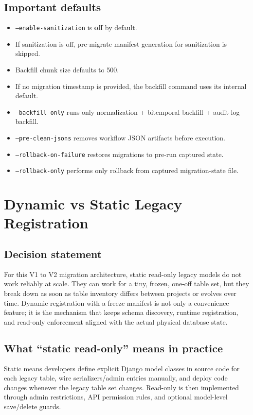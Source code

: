 \documentclass[11pt,a4paper]{article}
\begin{document}
\subsection*{Important defaults}
\begin{itemize}[leftmargin=1.5em]
  \item \texttt{--enable-sanitization} is \textbf{off} by default.
  \item If sanitization is off, pre-migrate manifest generation for sanitization is skipped.
  \item Backfill chunk size defaults to 500.
  \item If no migration timestamp is provided, the backfill command uses its internal default.
  \item \texttt{--backfill-only} runs only normalization + bitemporal backfill + audit-log backfill.
  \item \texttt{--pre-clean-jsons} removes workflow JSON artifacts before execution.
  \item \texttt{--rollback-on-failure} restores migrations to pre-run captured state.
  \item \texttt{--rollback-only} performs only rollback from captured migration-state file.
\end{itemize}

\newpage
\section{Dynamic vs Static Legacy Registration}
\subsection*{Decision statement}
For this V1 to V2 migration architecture, static read-only legacy models do not work
reliably at scale. They can work for a tiny, frozen, one-off table set, but they break
down as soon as table inventory differs between projects or evolves over time. Dynamic
registration with a freeze manifest is not only a convenience feature; it is the mechanism
that keeps schema discovery, runtime registration, and read-only enforcement aligned with
the actual physical database state.

\subsection*{What ``static read-only'' means in practice}
Static means developers define explicit Django model classes in source code for each legacy
table, wire serializers/admin entries manually, and deploy code changes whenever the legacy
table set changes. Read-only is then implemented through admin restrictions, API permission
rules, and optional model-level save/delete guards.
\end{document}
